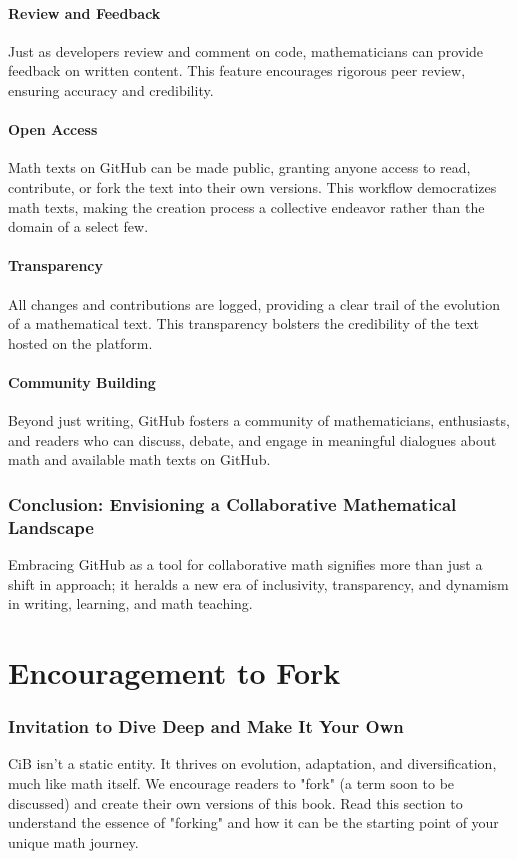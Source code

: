 \documentclass[a4paper,12pt]{book}
\begin{document}
\subsubsection*{Review and Feedback}
Just as developers review and comment on code, mathematicians can provide feedback on written content. This feature encourages rigorous peer review, ensuring accuracy and credibility.

\subsubsection*{Open Access}
Math texts on GitHub can be made public, granting anyone access to read, contribute, or fork the text into their own versions. This workflow democratizes math texts, making the creation process a collective endeavor rather than the domain of a select few.

\subsubsection*{Transparency}
All changes and contributions are logged, providing a clear trail of the evolution of a mathematical text. This transparency bolsters the credibility of the text hosted on the platform.

\subsubsection*{Community Building}
Beyond just writing, GitHub fosters a community of mathematicians, enthusiasts, and readers who can discuss, debate, and engage in meaningful dialogues about math and available math texts on GitHub.

\subsection*{Conclusion: Envisioning a Collaborative Mathematical Landscape}
Embracing GitHub as a tool for collaborative math signifies more than just a shift in approach; it heralds a new era of inclusivity, transparency, and dynamism in writing, learning, and math teaching. 

\chapter{Encouragement to Fork}
\subsection*{Invitation to Dive Deep and Make It Your Own}
CiB isn't a static entity. It thrives on evolution, adaptation, and diversification, much like math itself. We encourage readers to "fork" (a term soon to be discussed) and create their own versions of this book. Read this section to understand the essence of "forking" and how it can be the starting point of your unique math journey.
\end{document}
